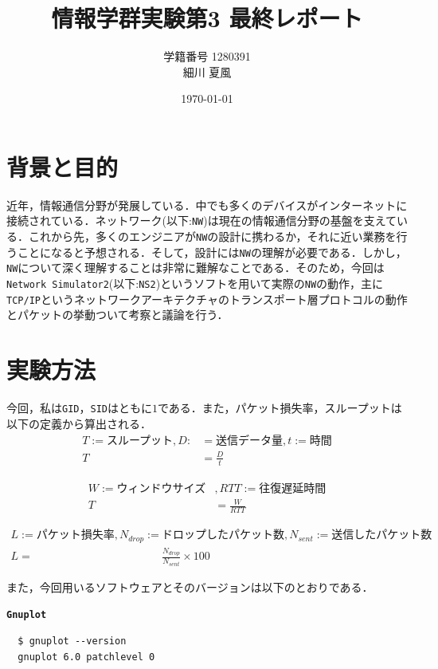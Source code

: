 \documentclass[paper=a4, fontsize=10pt]{jlreq}
\title{情報学群実験第3 最終レポート}
\author{学籍番号 1280391 \\ 細川 夏風}
\date{\today}
\begin{document}
\maketitle
\section{背景と目的}
近年，情報通信分野が発展している．中でも多くのデバイスがインターネットに接続されている．ネットワーク(以下:\texttt{NW})は現在の情報通信分野の基盤を支えている．これから先，多くのエンジニアが\texttt{NW}の設計に携わるか，それに近い業務を行うことになると予想される．そして，設計には\texttt{NW}の理解が必要である．しかし，\texttt{NW}について深く理解することは非常に難解なことである．そのため，今回は\texttt{Network Simulator2}(以下:\texttt{NS2})というソフトを用いて実際の\texttt{NW}の動作，主に\texttt{TCP/IP}というネットワークアーキテクチャのトランスポート層プロトコルの動作とパケットの挙動ついて考察と議論を行う．

\section{実験方法}
今回，私は\texttt{GID}，\texttt{SID}はともに$1$である．また，パケット損失率，スループットは以下の定義から算出される\cite{packet_chap}．
\begin{align*}
  T := \text{スループット}, D :&= \text{送信データ量}, t := \text{時間} \\
  T &= \frac{D}{t}
\end{align*}

\begin{align*}
  W := \text{ウィンドウサイズ}&, RTT := \text{往復遅延時間} \\
  T &= \frac{W}{RTT}
\end{align*}

\begin{align*}
  L := \text{パケット損失率}, N_{drop} := &\text{ドロップしたパケット数}, N_{sent} := \text{送信したパケット数} \\
  L = &\frac{N_{drop}}{N_{sent}} \times 100
\end{align*}

また，今回用いるソフトウェアとそのバージョンは以下のとおりである．

\vspace{2em}

\textbf{\texttt{Gnuplot}}
\begin{lstlisting}
  $ gnuplot --version
  gnuplot 6.0 patchlevel 0
\end{lstlisting}
\end{document}
